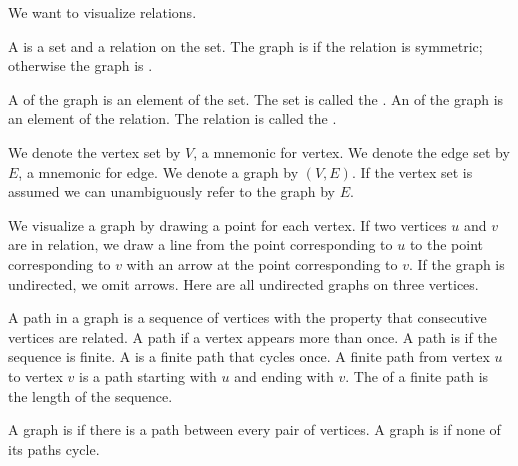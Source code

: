 

We want to visualize relations.


A  is a set and a relation
on the set.
The graph is 
if the relation is symmetric; otherwise the
graph is .

A  of the graph is an element
of the set.
The set is called the .
An  of the graph is an element of
the relation.
The relation is called the .



We denote the vertex set by $V$, a mnemonic for
vertex.
We denote the edge set by $E$, a mnemonic for
edge.
We denote a graph by $(V, E)$.
If the vertex set is assumed we can
unambiguously refer to the graph by $E$.


We visualize a graph by drawing a
point for each vertex.
If two vertices $u$ and $v$ are in relation,
we draw a line from the point corresponding
to $u$ to the point corresponding to $v$ with
an arrow at the point corresponding to $v$.
If the graph is undirected, we omit arrows.
Here are all undirected graphs on three
vertices.



A path in a graph is a sequence of
vertices with the property that
consecutive vertices are related.
A path  if a vertex
appears more than once.
A path is  if the
sequence is finite.
A  is a finite path
that cycles once.
A finite path from vertex $u$ to vertex $v$
is a path starting with $u$ and
ending with $v$.
The  of a finite path is
the length of the sequence.


A graph is 
if there is a path between every pair
of vertices. A graph is
 if none of its
paths cycle.
